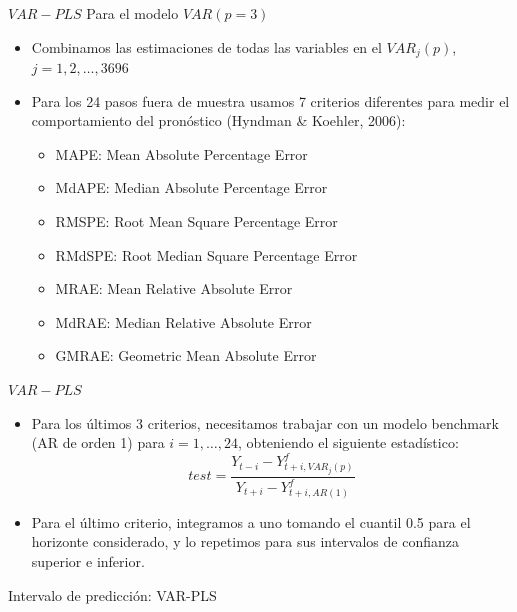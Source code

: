 \documentclass{beamer}
\newcommand{\?}{?`}
\begin{document}
\begin{frame}{$VAR-PLS$}
  Para el modelo $VAR(p=3)$
  \begin{itemize}
  \item Combinamos las estimaciones de todas las variables en el
    $VAR_j(p)$, $j=1,2,\ldots,3696$
  \item Para los 24 pasos fuera de muestra usamos 7 criterios
    diferentes para medir el comportamiento del pron\'ostico (Hyndman
    \& Koehler, 2006):
    \begin{itemize}
    \item MAPE: Mean Absolute Percentage Error
    \item MdAPE: Median Absolute Percentage Error
    \item RMSPE: Root Mean Square Percentage Error
    \item RMdSPE: Root Median Square Percentage Error
    \item MRAE: Mean Relative Absolute Error
    \item MdRAE: Median Relative Absolute Error
    \item GMRAE: Geometric Mean Absolute Error
    \end{itemize}
  \end{itemize}
\end{frame}

\begin{frame}{$VAR-PLS$}
  \begin{itemize}
  \item Para los \'ultimos 3 criterios, necesitamos trabajar con un
    modelo benchmark (AR de orden 1) para $i=1,\ldots,24$,
    obteniendo el siguiente estad\'istico:
    \begin{displaymath}
      test=\frac{Y_{t-i}-Y_{t+i,VAR_j(p)}^f}{Y_{t+i}-Y_{t+i,AR(1)}^f}
    \end{displaymath}
  \item Para el \'ultimo criterio, integramos a uno tomando el cuantil
    0.5 para el horizonte considerado, y lo repetimos para sus
    intervalos de confianza superior e inferior.
  \end{itemize}
\end{frame}

\begin{frame}{}
  \begin{block}{}
    \begin{center}
      \vspace{3mm}
      {\Large Intervalo de predicci\'on: VAR-PLS}
      \vspace{3mm}
    \end{center}
  \end{block}
\end{frame}
\end{document}
